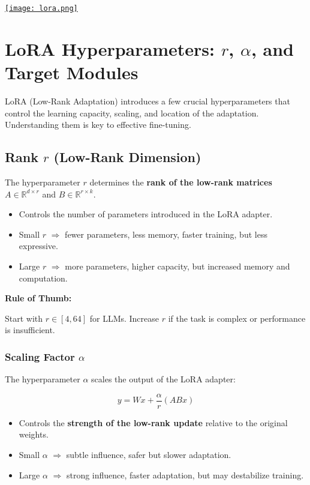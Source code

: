 \href{https://substackcdn.com/image/fetch/$s_!igxz!,f_auto,q_auto:good,fl_progressive:steep/https%3A%2F%2Fsubstack-post-media.s3.amazonaws.com%2Fpublic%2Fimages%2F1b402882-3dc1-4d5b-ba11-7f4f6d40d888_914x1116.gif}{%
    \texttt{[image: lora.png]}%
}
\newpage
\section{LoRA Hyperparameters: $r$, $\alpha$, and Target Modules}

LoRA (Low-Rank Adaptation) introduces a few crucial hyperparameters that control the learning capacity, scaling, and location of the adaptation. Understanding them is key to effective fine-tuning.

\subsection{Rank $r$ (Low-Rank Dimension)}
The hyperparameter $r$ determines the \textbf{rank of the low-rank matrices} $A \in \mathbb{R}^{d \times r}$ and $B \in \mathbb{R}^{r \times k}$.  

\begin{itemize}
    \item Controls the number of parameters introduced in the LoRA adapter.
    \item Small $r$ $\Rightarrow$ fewer parameters, less memory, faster training, but less expressive.
    \item Large $r$ $\Rightarrow$ more parameters, higher capacity, but increased memory and computation.
\end{itemize}

\textbf{Rule of Thumb:}  
\begin{tcolorbox}[colback=blue!5!white,colframe=blue!75!black]
Start with $r \in [4, 64]$ for LLMs. Increase $r$ if the task is complex or performance is insufficient.
\end{tcolorbox}

\subsubsection{Scaling Factor $\alpha$}
The hyperparameter $\alpha$ scales the output of the LoRA adapter:

\[
y = W x + \frac{\alpha}{r} (A B x)
\]

\begin{itemize}
    \item Controls the \textbf{strength of the low-rank update} relative to the original weights.
    \item Small $\alpha$ $\Rightarrow$ subtle influence, safer but slower adaptation.
    \item Large $\alpha$ $\Rightarrow$ strong influence, faster adaptation, but may destabilize training.
\end{itemize}

